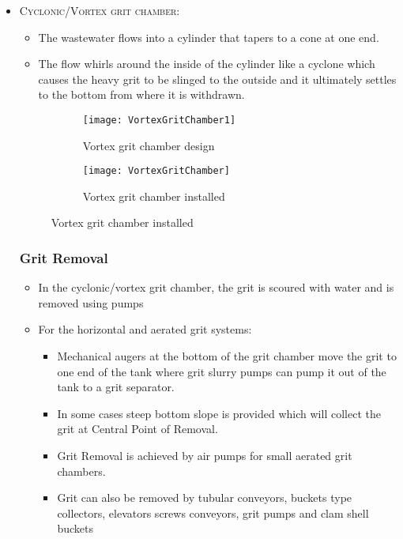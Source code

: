 \begin{itemize}
						\item \noindent\textsc{Cyclonic/Vortex grit chamber:}


					\begin{itemize}
						\item The wastewater flows into a cylinder that tapers to a cone at one end.
						\item The flow whirls around the inside of the cylinder like a cyclone which causes the heavy grit to be slinged to the outside and it ultimately settles to the bottom from where it is withdrawn.
					\end{itemize}

\begin{figure}[h!]
  \centering
  \begin{subfigure}[b]{0.47\linewidth}
    \texttt{[image: VortexGritChamber1]}
    \caption{Vortex grit chamber design}
  \end{subfigure}
  \hspace{0.2cm}
  \begin{subfigure}[b]{0.43\linewidth}
    \texttt{[image: VortexGritChamber]}
    \caption{Vortex grit chamber installed}
  \end{subfigure}
\end{figure} 
	
\subsubsection{Grit Removal}		

		
			\begin{itemize}
				\item In the cyclonic/vortex grit chamber, the grit is scoured with water and is removed using pumps
				\item For the horizontal and aerated grit systems:
					\begin{itemize}
						\item Mechanical augers at the bottom of the grit chamber move the grit to one end of the tank where grit slurry pumps can pump it out of the tank to a grit separator.
						\item In some cases steep bottom slope is provided which will collect the grit at Central Point of Removal.
						\item Grit Removal is achieved by air pumps for small aerated grit chambers.
						\item Grit can also be removed by tubular conveyors, buckets type collectors, elevators screws conveyors, grit pumps and clam shell buckets
					\end{itemize}
			\end{itemize}
						\end{itemize}

